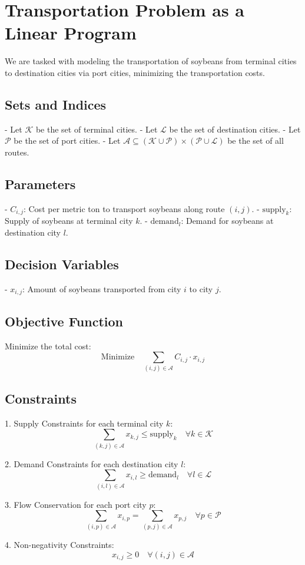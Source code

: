 \documentclass{article}
\begin{document}
\section*{Transportation Problem as a Linear Program}

We are tasked with modeling the transportation of soybeans from terminal cities to destination cities via port cities, minimizing the transportation costs.

\subsection*{Sets and Indices}
- Let \( \mathcal{K} \) be the set of terminal cities.
- Let \( \mathcal{L} \) be the set of destination cities.
- Let \( \mathcal{P} \) be the set of port cities.
- Let \( \mathcal{A} \subseteq (\mathcal{K} \cup \mathcal{P}) \times (\mathcal{P} \cup \mathcal{L}) \) be the set of all routes.

\subsection*{Parameters}
- \( C_{i,j} \): Cost per metric ton to transport soybeans along route \((i, j) \).
- \( \text{supply}_k \): Supply of soybeans at terminal city \( k \).
- \( \text{demand}_l \): Demand for soybeans at destination city \( l \).

\subsection*{Decision Variables}
- \( x_{i,j} \): Amount of soybeans transported from city \( i \) to city \( j \).

\subsection*{Objective Function}
Minimize the total cost:
\[
\text{Minimize} \quad \sum_{(i,j) \in \mathcal{A}} C_{i,j} \cdot x_{i,j}
\]

\subsection*{Constraints}
1. Supply Constraints for each terminal city \( k \):
\[
\sum_{(k,j) \in \mathcal{A}} x_{k,j} \leq \text{supply}_k \quad \forall k \in \mathcal{K}
\]

2. Demand Constraints for each destination city \( l \):
\[
\sum_{(i,l) \in \mathcal{A}} x_{i,l} \geq \text{demand}_l \quad \forall l \in \mathcal{L}
\]

3. Flow Conservation for each port city \( p \):
\[
\sum_{(i,p) \in \mathcal{A}} x_{i,p} = \sum_{(p,j) \in \mathcal{A}} x_{p,j} \quad \forall p \in \mathcal{P}
\]

4. Non-negativity Constraints:
\[
x_{i,j} \geq 0 \quad \forall (i,j) \in \mathcal{A}
\]
\end{document}

